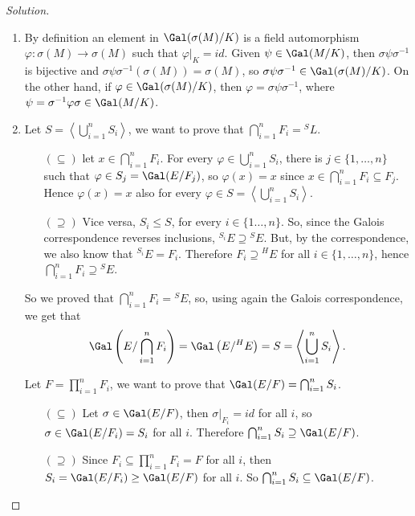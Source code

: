 \documentclass[a4paper,10pt,reqno]{amsart}
\newenvironment{sol}
  {\renewcommand\qedsymbol{$\blacksquare$}\begin{proof}[Solution]}
  {\end{proof}}
\begin{document}
\begin{sol}
~
\begin{enumerate}[label=(\roman*)]
\item By definition an element in $\Gal(\sigma(M)/K)$
is a field automorphism $\varphi:\sigma(M)\to \sigma(M)$ such that $\varphi|_K=id$.
Given $\psi\in \Gal(M/K)$, then 
$\sigma\psi\sigma^{-1}$ is bijective and
$\sigma\psi\sigma^{-1}(\sigma(M))=\sigma(M)$,
so $\sigma\psi\sigma^{-1}\in \Gal(\sigma(M)/K)$.
On the other hand, if $\varphi\in \Gal(\sigma(M)/K)$, then $\varphi=\sigma\psi\sigma^{-1}$, where $\psi=\sigma^{-1}\varphi\sigma\in \Gal(M/K)$.
\item Let $S=\left\langle\bigcup_{i=1}^nS_i\right\rangle$,
we want to prove that $\bigcap_{i=1}^nF_i={}^S L$.
\begin{itemize}
    \item[$(\subseteq)$] let 
$x\in \bigcap_{i=1}^nF_i$. For every $\varphi\in \bigcup_{i=1}^nS_i$, there is $j\in\{1,\dots, n\}$ such that $\varphi\in S_j=\Gal(E/F_j)$, so $\varphi(x)=x$ since $x\in \bigcap_{i=1}^nF_i\subseteq F_j$.
Hence $\varphi(x)=x$ also for every $\varphi\in S=\left\langle\bigcup_{i=1}^nS_i\right\rangle$.
    \item[$(\supseteq)$] Vice versa, $S_i\leq S$, for every $i\in\{1\dots,n\}$. So, since the Galois correspondence reverses inclusions,
${}^{S_i}E\supseteq{}^SE$. But, by the correspondence, we also know that ${}^{S_i}E=F_i$.
Therefore $F_i\supseteq {}^HE$ for all $i\in\{1,\dots,n\}$, hence $\bigcap_{i=1}^nF_i \supseteq {}^SE$.
\end{itemize}
So we proved that $\bigcap_{i=1}^nF_i={}^S E$, so, using again the Galois correspondence,
we get that $$\Gal\left(E/\bigcap_{i=1}^nF_i\right)=\Gal\left(E/{}^H E\right)=S=\left\langle\bigcup_{i=1}^nS_i\right\rangle.$$

Let $F=\prod_{i=1}^nF_i$,
we want to prove that $\Gal(E/F)=\bigcap_{i=1}^nS_i$.
\begin{itemize}
    \item[$(\subseteq)$]  Let $\sigma \in \Gal(E/F)$, then $\sigma|_{F_i}=id$ for all $i$, so $\sigma\in \Gal(E/F_i)=S_i$ for all $i$.
Therefore $\bigcap_{i=1}^nS_i\supseteq \Gal(E/F)$.
\item[$(\supseteq)$] Since $F_i\subseteq \prod_{i=1}^nF_i=F$ for all  $i$,
then $S_i=\Gal(E/F_i)\geq \Gal(E/F)$
for all $i$.
So $\bigcap_{i=1}^nS_i\subseteq \Gal(E/F)$.\qedhere
\end{itemize}

\end{enumerate}
    
\end{sol}
\end{document}
